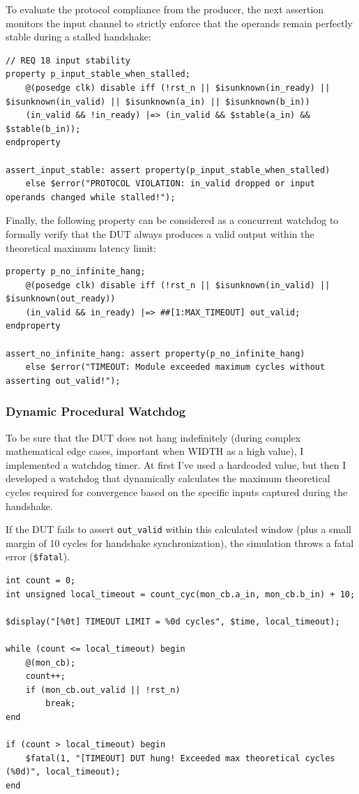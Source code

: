 To evaluate the protocol compliance from the producer, the next assertion monitors the input channel to strictly enforce that the operands remain perfectly stable during a stalled handshake:
\begin{verbatim}
// REQ 18 input stability
property p_input_stable_when_stalled;
    @(posedge clk) disable iff (!rst_n || $isunknown(in_ready) || $isunknown(in_valid) || $isunknown(a_in) || $isunknown(b_in))
    (in_valid && !in_ready) |=> (in_valid && $stable(a_in) && $stable(b_in));
endproperty

assert_input_stable: assert property(p_input_stable_when_stalled)
    else $error("PROTOCOL VIOLATION: in_valid dropped or input operands changed while stalled!");
\end{verbatim}

Finally, the following property can be considered as a concurrent watchdog to formally verify that the DUT always produces a valid output within the theoretical maximum latency limit:
\begin{verbatim}
property p_no_infinite_hang;
    @(posedge clk) disable iff (!rst_n || $isunknown(in_valid) || $isunknown(out_ready))
    (in_valid && in_ready) |=> ##[1:MAX_TIMEOUT] out_valid;
endproperty

assert_no_infinite_hang: assert property(p_no_infinite_hang)
    else $error("TIMEOUT: Module exceeded maximum cycles without asserting out_valid!");
\end{verbatim}

\subsubsection{Dynamic Procedural Watchdog}
To be sure that the DUT does not hang indefinitely  (during complex mathematical edge cases, important when WIDTH as a high value), I implemented a watchdog timer. At first I've used a hardcoded value, but then I developed a watchdog that dynamically calculates the maximum theoretical cycles required for convergence based on the specific inputs captured during the handshake.

If the DUT fails to assert \texttt{out\_valid} within this calculated window (plus a small margin of 10 cycles for handshake synchronization), the simulation throws a fatal error (\texttt{\$fatal}).

\newpage

\begin{verbatim}
int count = 0;
int unsigned local_timeout = count_cyc(mon_cb.a_in, mon_cb.b_in) + 10;  

$display("[%0t] TIMEOUT LIMIT = %0d cycles", $time, local_timeout);

while (count <= local_timeout) begin      
    @(mon_cb);
    count++;
    if (mon_cb.out_valid || !rst_n)
        break;
end

if (count > local_timeout) begin          
    $fatal(1, "[TIMEOUT] DUT hung! Exceeded max theoretical cycles (%0d)", local_timeout);
end
\end{verbatim}

